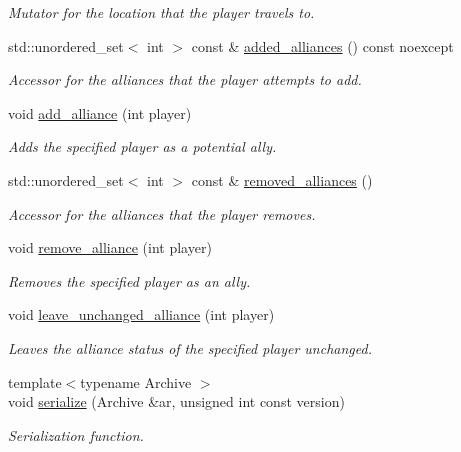 \begin{DoxyCompactItemize}
\begin{DoxyCompactList}\small\item\em Mutator for the location that the player travels to. \end{DoxyCompactList}\item 
std\+::unordered\+\_\+set$<$ int $>$ const  \& \hyperlink{classexternal_1_1_move_data_a0bcb09d49ed392fb21395d6182d63f26}{added\+\_\+alliances} () const noexcept
\begin{DoxyCompactList}\small\item\em Accessor for the alliances that the player attempts to add. \end{DoxyCompactList}\item 
void \hyperlink{classexternal_1_1_move_data_ae3a11d3c816e165ac2ceff604f191d32}{add\+\_\+alliance} (int player)
\begin{DoxyCompactList}\small\item\em Adds the specified player as a potential ally. \end{DoxyCompactList}\item 
std\+::unordered\+\_\+set$<$ int $>$ const  \& \hyperlink{classexternal_1_1_move_data_addc5f0e83d4c41edab01fe2e804b3eeb}{removed\+\_\+alliances} ()
\begin{DoxyCompactList}\small\item\em Accessor for the alliances that the player removes. \end{DoxyCompactList}\item 
void \hyperlink{classexternal_1_1_move_data_a397656419a2c5adf79ee8bf1bfae9ca8}{remove\+\_\+alliance} (int player)
\begin{DoxyCompactList}\small\item\em Removes the specified player as an ally. \end{DoxyCompactList}\item 
void \hyperlink{classexternal_1_1_move_data_a15f54d7e6fbf21cc9634e6f2bb854317}{leave\+\_\+unchanged\+\_\+alliance} (int player)
\begin{DoxyCompactList}\small\item\em Leaves the alliance status of the specified player unchanged. \end{DoxyCompactList}\item 
{\footnotesize template$<$typename Archive $>$ }\\void \hyperlink{classexternal_1_1_move_data_afd1bb4302c0f725033149887c232af1a}{serialize} (Archive \&ar, unsigned int const version)
\begin{DoxyCompactList}\small\item\em Serialization function. \end{DoxyCompactList}\end{DoxyCompactItemize}


